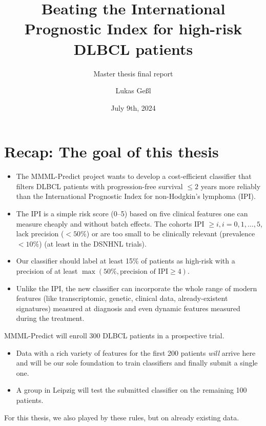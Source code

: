 \documentclass[10pt, aspectratio=169]{beamer}
\title{Beating the International Prognostic Index for high-risk DLBCL patients}
\subtitle{Master thesis final report}
\date{July 9th, 2024}
\author{Lukas Geßl}
\institute{Chair of Statistical Bioinformatics, Regensburg University}
\begin{document}
\maketitle

\section{Recap: The goal of this thesis}

\begin{frame}{}
  \begin{itemize}
    \item The MMML-Predict project wants to develop a cost-efficient classifier 
    that filters DLBCL patients with progression-free survival $\leq 2$ years more reliably 
    than the International Prognostic Index for non-Hodgkin's lymphoma (IPI).
    \pause
    \item The IPI \cite{ipi93} is a simple risk score (0--5) based on five clinical features one can
    measure cheaply and without batch effects. The cohorts IPI $\geq i, i = 0, 1, \ldots, 5$,
    lack precision ($< 50 \%$) or are too small to be clinically relevant
    (prevalence $< 10 \%$) (at least in the DSNHNL trials).
    \item Our classifier should label at least 15\% of patients as high-risk with a precision
    of at least $\max(50\%, \text{precision of IPI} \geq 4)$.
    \pause
    \item Unlike the IPI, the new classifier can incorporate the whole range of 
    modern features (like transcriptomic, genetic, clinical data, already-existent 
    signatures) measured at diagnosis and even dynamic features measured during 
    the treatment.
  \end{itemize}
\end{frame}

\begin{frame}
  MMML-Predict will enroll 300 DLBCL patients in a prospective trial.
  \begin{itemize}
    \item Data with a rich variety of features for the first 200 patients 
      \textit{will} arrive here and will be our sole foundation to train 
        classifiers and finally submit a single one.
    \item A group in Leipzig will test the submitted classifier on the remaining 
      100 patients.
  \end{itemize}
  \pause
  For this thesis, we also played by these rules, but on already existing data.
\end{frame}
\end{document}
